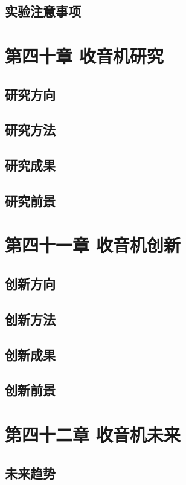 \documentclass[12pt,UTF8]{ctexbook}
\begin{document}
\section{实验注意事项}

\chapter{第四十章 收音机研究}

\section{研究方向}
\section{研究方法}
\section{研究成果}
\section{研究前景}

\chapter{第四十一章 收音机创新}

\section{创新方向}
\section{创新方法}
\section{创新成果}
\section{创新前景}

\chapter{第四十二章 收音机未来}

\section{未来趋势}
\end{document}
